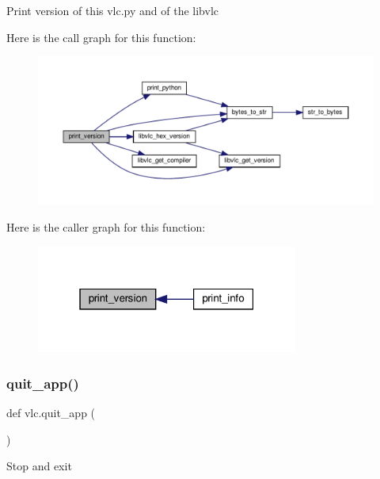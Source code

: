 \begin{DoxyVerb}Print version of this vlc.py and of the libvlc\end{DoxyVerb}
 Here is the call graph for this function\+:
\nopagebreak
\begin{figure}[H]
\begin{center}
\leavevmode
\includegraphics[width=350pt]{namespacevlc_afaf7aed42d25971d0efaf408a51c8f2d_cgraph}
\end{center}
\end{figure}
Here is the caller graph for this function\+:
\nopagebreak
\begin{figure}[H]
\begin{center}
\leavevmode
\includegraphics[width=244pt]{namespacevlc_afaf7aed42d25971d0efaf408a51c8f2d_icgraph}
\end{center}
\end{figure}
\mbox{\label{namespacevlc_a6a0bba2d1163dfc99df31893cd79e079}} 
\subsubsection{\texorpdfstring{quit\+\_\+app()}{quit\_app()}}
{\footnotesize\ttfamily def vlc.\+quit\+\_\+app (\begin{DoxyParamCaption}{ }\end{DoxyParamCaption})}

\begin{DoxyVerb}Stop and exit\end{DoxyVerb}
 \mbox{\label{namespacevlc_a07c403b7dd6c2fb6ca0db5f0c198686d}} 
